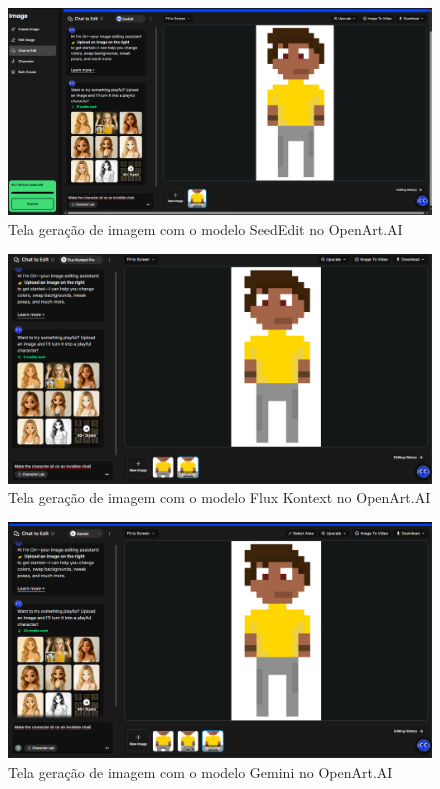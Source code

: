 \begin{figure}[htbp]
    \centering
    \caption{\small Tela geração de imagem com o modelo SeedEdit no OpenArt.AI}
    \label{fig:openArtModeloSeedEdit}
    \includegraphics[width=1\linewidth]{figs/OpenArtAI/telaSeeEdit.PNG}
\end{figure}


\begin{figure}[htbp]
    \centering
    \caption{\small Tela geração de imagem com o modelo Flux Kontext no OpenArt.AI}
    \label{fig:openArtModeloFluxContext}
    \includegraphics[width=1\linewidth]{figs/OpenArtAI/telafluxKontextPro.PNG}
\end{figure}

\begin{figure}[htbp]
    \centering
    \caption{\small Tela geração de imagem com o modelo Gemini no OpenArt.AI}
    \label{fig:openArtModeloGemini}
    \includegraphics[width=1\linewidth]{figs/OpenArtAI/telaGemini.PNG}
\end{figure}

